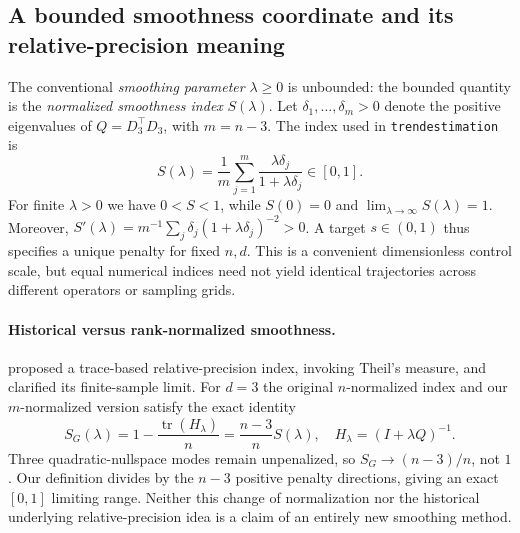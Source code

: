 \subsection{A bounded smoothness coordinate and its relative-precision meaning}
\label{sec:precision-index}
The conventional \emph{smoothing parameter} $\lambda\ge0$
is unbounded: the bounded quantity is the
\emph{normalized smoothness index} $S(\lambda)$.
Let $\delta_1,\ldots,\delta_m>0$ denote the positive
eigenvalues of $Q=D_3^\top D_3$, with $m=n-3$.
The index used in \texttt{trendestimation} is
\begin{equation}\label{eq:S}
S(\lambda)=\frac1m\sum_{j=1}^{m}
\frac{\lambda\delta_j}{1+\lambda\delta_j}
\in[0,1].
\end{equation}
For finite $\lambda>0$ we have $0<S<1$, while
$S(0)=0$ and $\lim_{\lambda\to\infty}S(\lambda)=1$.
Moreover,
$S'(\lambda)=m^{-1}\sum_j\delta_j
(1+\lambda\delta_j)^{-2}>0$.
A target $s\in(0,1)$ thus specifies a unique
penalty for fixed $n,d$. This is a convenient
dimensionless control scale, but equal numerical
indices need not yield identical trajectories
across different operators or sampling grids.

\paragraph{Historical versus rank-normalized smoothness.}
\citet{guerrero2007} proposed a trace-based
relative-precision index, invoking Theil's
measure, and \citet{cortes2017} clarified
its finite-sample limit. For $d=3$ the original
$n$-normalized index and our $m$-normalized
version satisfy the exact identity
\begin{equation}\label{eq:guerrero-normalization}
S_G(\lambda)=1-\frac{\operatorname{tr}(H_\lambda)}n
=\frac{n-3}{n}S(\lambda),\quad
H_\lambda=(I+\lambda Q)^{-1}.
\end{equation}
Three quadratic-nullspace modes remain
unpenalized, so $S_G\to(n-3)/n$, not $1$.
Our definition divides by the $n-3$ positive
penalty directions, giving an exact $[0,1]$
limiting range. Neither this change of
normalization nor the historical underlying
relative-precision idea is a claim of an
entirely new smoothing method.

